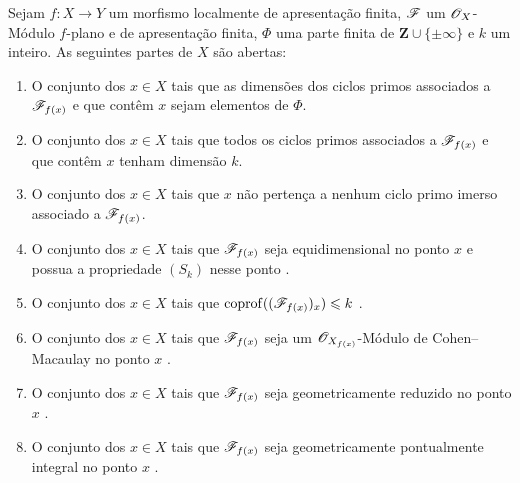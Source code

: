 \begin{theorem}[12.1.1]
\label{IV.12.1.1}
Sejam $f:X\to Y$ um morfismo localmente de apresentação finita,
$\mathscr{F}$ um $\mathscr{O}_X$-Módulo $f$-plano e de apresentação finita,
$\Phi$ uma parte finita de $\mathbf Z\cup\{\pm\infty\}$ e $k$ um
inteiro. As seguintes partes de $X$ são abertas:
\begin{enumerate}[label=(\roman*)]
\item O conjunto dos $x\in X$ tais que as dimensões dos ciclos
primos associados a $\mathscr{F}_{f(x)}$ e que contêm $x$ sejam
elementos de $\Phi$.
\item O conjunto dos $x\in X$ tais que todos os ciclos primos
associados a $\mathscr{F}_{f(x)}$ e que contêm $x$ tenham dimensão $k$.
\item O conjunto dos $x\in X$ tais que $x$ não pertença a nenhum
ciclo primo imerso associado a $\mathscr{F}_{f(x)}$.
\item O conjunto dos $x\in X$ tais que $\mathscr{F}_{f(x)}$ seja
equidimensional no ponto $x$ e possua a propriedade $(S_k)$ nesse
ponto .
\item O conjunto dos $x\in X$ tais que
$\operatorname{coprof}((\mathscr{F}_{f(x)})_x)\leqslant k$
.
\item O conjunto dos $x\in X$ tais que $\mathscr{F}_{f(x)}$ seja um
$\mathscr{O}_{X_{f(x)}}$-Módulo de Cohen--Macaulay no ponto $x$
.
\item O conjunto dos $x\in X$ tais que $\mathscr{F}_{f(x)}$ seja
geometricamente reduzido no ponto $x$ .
\item O conjunto dos $x\in X$ tais que $\mathscr{F}_{f(x)}$ seja
geometricamente pontualmente integral no ponto $x$
.
\end{enumerate}
\end{theorem}

